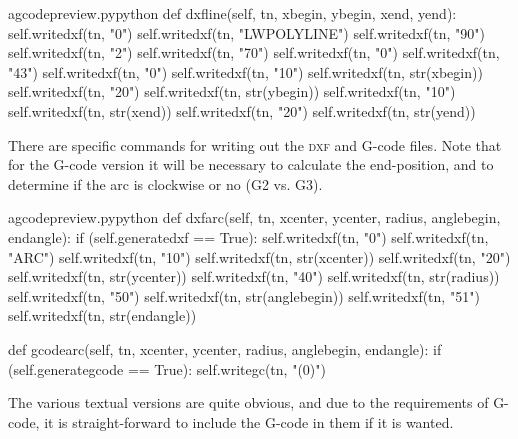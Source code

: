 \documentclass{ltxdoc}
\begin{document}
\lstset{firstnumber=\thegcpy}
\begin{writecode}{a}{gcodepreview.py}{python}
    def dxfline(self, tn, xbegin, ybegin, xend, yend):
        self.writedxf(tn, "0")
        self.writedxf(tn, "LWPOLYLINE")
        self.writedxf(tn, "90")
        self.writedxf(tn, "2")
        self.writedxf(tn, "70")
        self.writedxf(tn, "0")
        self.writedxf(tn, "43")
        self.writedxf(tn, "0")
        self.writedxf(tn, "10")
        self.writedxf(tn, str(xbegin))
        self.writedxf(tn, "20")
        self.writedxf(tn, str(ybegin))
        self.writedxf(tn, "10")
        self.writedxf(tn, str(xend))
        self.writedxf(tn, "20")
        self.writedxf(tn, str(yend))

\end{writecode}
\addtocounter{gcpy}{18}


There are specific commands for writing out the \textsc{dxf} and G-code files. Note that for the G-code version it will be necessary to calculate the end-position, and to determine if the arc is clockwise or no (G2 vs. G3).

\lstset{firstnumber=\thegcpy}
\begin{writecode}{a}{gcodepreview.py}{python}
    def dxfarc(self, tn, xcenter, ycenter, radius, anglebegin, endangle):
        if (self.generatedxf == True):
            self.writedxf(tn, "0")
            self.writedxf(tn, "ARC")
            self.writedxf(tn, "10")
            self.writedxf(tn, str(xcenter))
            self.writedxf(tn, "20")
            self.writedxf(tn, str(ycenter))
            self.writedxf(tn, "40")
            self.writedxf(tn, str(radius))
            self.writedxf(tn, "50")
            self.writedxf(tn, str(anglebegin))
            self.writedxf(tn, "51")
            self.writedxf(tn, str(endangle))

    def gcodearc(self, tn, xcenter, ycenter, radius, anglebegin, endangle):
        if (self.generategcode == True):
            self.writegc(tn, "(0)")

\end{writecode}
\addtocounter{gcpy}{19}

The various textual versions are quite obvious, and due to the requirements of G-code, it is straight-forward to include the G-code in them if it is wanted.
\end{document}
